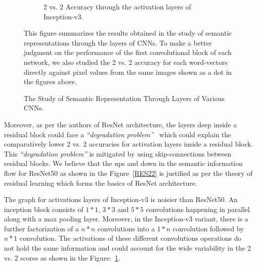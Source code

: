 \begin{figure}[H]
\begin{subfigure}[t]{0.49\textwidth}
        \centering
        \caption{2 vs. 2 Accuracy through the activation layers of Inception-v3.}
        \label{inception22}
    \end{subfigure}
    \caption{The Study of Semantic Representation Through Layers of Various CNNs.}
    \label{CNNSemanticsREsults}
 
    This figure summarizes the results obtained in the study of semantic representations through the layers of CNNs. To make a better judgment on the performance of the first convolutional block of each network, we also studied the 2 vs. 2 accuracy for each word-vectors directly against pixel values from the same images shown as a dot in the figures above.
\end{figure}
Moreover, as per the authors of ResNet architecture, the layers deep inside a residual block could face a \textit{``degradation problem''}~\cite{ResNet} which could explain the comparatively lower 2 vs. 2 accuracies for activation layers inside a residual block. This \textit{``degradation problem''} is mitigated by using skip-connections between residual blocks. We believe that the ups and down in the semantic information flow for ResNet50 as shown in the Figure~\ref{RES22} is justified as per the theory of residual learning which forms the basics of ResNet architecture.


 
The graph for activations layers of Inception-v3 is noisier than ResNet50. An inception block consists of $1*1$, $3*3$ and $5*5$ convolutions happening in parallel along with a max pooling layer. Moreover, in the Inception-v3 variant, there is a further factorization of a $n*n$ convolutions into a $1*n$ convolution followed by $n*1$ convolution. The activations of these different convolutions operations do not hold the same information and could account for the wide variability in the 2 vs. 2 scores as shown in the Figure:~\ref{inception22}.

